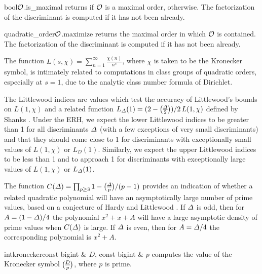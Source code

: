 \begin{fcode}{bool}{$\mathcal{O}$.is_maximal}{}
  returns \TRUE if $\mathcal{O}$ is a maximal order, \FALSE otherwise.  The factorization of the
  discriminant is computed if it has not been already.
\end{fcode}

\begin{fcode}{quadratic_order}{$\mathcal{O}$.maximize}{}
  returns the maximal order in which $\mathcal{O}$ is contained.  The factorization of the discriminant
  is computed if it has not been already.
\end{fcode}




The function $L(s,\chi ) = \sum_{n=1}^{\infty} \frac{\chi (n)}{n^s}$, where $\chi$ is taken to
be the Kronecker symbol, is intimately related to computations in class groups of quadratic
orders, especially at $s=1$, due to the analytic class number formula of Dirichlet.

The Littlewood indices \cite{Littlewood:1928,Shanks:1973} are values which test the accuracy of
Littlewood's bounds on $L(1,\chi )$ and a related function $L_{\D}(1) = (2 -
\kronecker{\D}{2})/2 \,L(1,\chi )$ defined by Shanks \cite{Shanks:1973}.  Under the ERH, we
expect the lower Littlewood indices to be greater than 1 for all discriminants $\varDelta$ (with a few
exceptions of very small discriminants) and that they should come close to 1 for discriminants
with exceptionally small values of $L(1,\chi )$ or $L_D(1)$.  Similarly, we expect the upper
Littlewood indices to be less than 1 and to approach 1 for discriminants with exceptionally
large values of $L(1,\chi )$ or $L_{\varDelta}(1)$.

The function $C(\D) = \prod_{p \geq 3} 1 - \kronecker{\D}{p} / (p-1)$ provides an indication of
whether a related quadratic polynomial will have an asymptotically large number of prime values,
based on a conjecture of Hardy and Littlewood \cite{Hardy/Littlewood:1923,Fung/Williams:1990}.
If $\varDelta$ is odd, then for $A = (1-\varDelta)/4$ the polynomial $x^2 + x + A$ will have a large
asymptotic density of prime values when $C(\varDelta )$ is large.  If $\varDelta$ is even, then for $A = \varDelta /
4$ the corresponding polynomial is $x^2 + A$.

\begin{fcode}{int}{kronecker}{const bigint & $D$, const bigint & $p$}
  computes the value of the Kronecker symbol $\kronecker{D}{p}$, where $p$ is prime.
\end{fcode}

